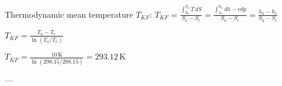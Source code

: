 Thermodynamic mean temperature \( T_{KF} \):  
\( T_{KF} = \frac{\int_{S_e}^{S_a} T \, dS}{S_a - S_e} = \frac{\int_{h_e}^{h_a} dh - v dp}{S_a - S_e} = \frac{h_a - h_e}{S_a - S_e} \)  

\( T_{KF} = \frac{T_a - T_e}{\ln(T_a / T_e)} \)  

\( T_{KF} = \frac{10 \, \text{K}}{\ln(298.15 / 288.15)} = 293.12 \, \text{K} \)  

---